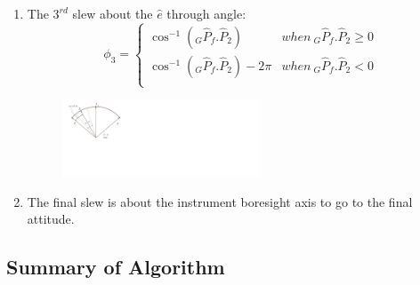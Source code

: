 \documentclass[letterpaper, preprint, paper,11pt]{AAS}	%
\begin{document}
\begin{enumerate}
			\item The $3^{rd}$ slew about the $\hat{e}$ through angle:
			\begin{equation}
				\phi_3=\left\{
				\begin{array}{ll}
				\cos^{-1}(_G\hat{P}_f.\hat{P}_2)& when\  _G\hat{P}_f.\hat{P}_2\geq 0\\
				\cos^{-1}(_G\hat{P}_f.\hat{P}_2)-2\pi& when\ _G\hat{P}_f.\hat{P}_2<0\\
				\end{array}
				\right.
			\end{equation}
			\begin{figure}[H]
				\begin{center}
				\includegraphics[width=2.3in]{./Figures/SVAS_4r}
				\end{center}
			\end{figure}
			\item The final slew is about the instrument boresight axis to go to the final attitude. 
			\end{enumerate}
	
	
	\subsection{Summary of Algorithm} 
		
\end{document}
